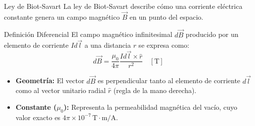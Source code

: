 \documentclass[10pt, aspectratio=169]{beamer}
\begin{document}
\primeraDiapo

\begin{frame}{Ley de Biot-Savart}
    La ley de Biot-Savart describe cómo una corriente eléctrica constante genera un campo magnético $\vec{B}$ en un punto del espacio.

    \begin{boxTeoria}{Definición Diferencial}
        El campo magnético infinitesimal $d\vec{B}$ producido por un elemento de corriente $I d\vec{l}$ a una distancia $r$ se expresa como:
        \begin{equation*}
            d\vec{B} = \frac{\mu_0}{4\pi} \frac{I d\vec{l} \times \hat{r}}{r^2} \quad [\unit{\tesla}]
        \end{equation*}
    \end{boxTeoria}

    \begin{itemize}
        \item \textbf{Geometría:} El vector $d\vec{B}$ es perpendicular tanto al elemento de corriente $d\vec{l}$ como al vector unitario radial $\hat{r}$ (regla de la mano derecha).
        \item \textbf{Constante ($\mu_0$):} Representa la permeabilidad magnética del vacío, cuyo valor exacto es $4\pi \times 10^{-7} \, \unit{\tesla\cdot\meter/\ampere}$.
    \end{itemize}
\end{frame}
\end{document}
